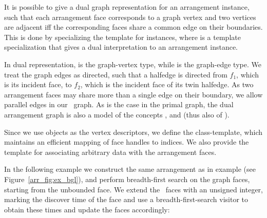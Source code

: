 It is possible to give a dual graph representation for an arrangement instance,
such that each arrangement face corresponds to a graph vertex and two vertices
are adjacent iff the corresponding faces share a common edge on their
boundaries. This is done by specializing the
 template for  instances,
where  is a template specialization that gives a
dual interpretation to an arrangement instance.

In dual representation, 
is the graph-vertex type, while  is the
graph-edge type. We treat the graph edges as directed, such that a halfedge
 is directed from $f_1$, which is its incident face, to $f_2$, which
is the incident face of its twin halfedge. As two arrangement faces may
share more than a single edge on their boundary, we allow parallel
edges in our \boost\ graph. As is the case in the primal graph, the dual
arrangement graph is also a model of the concepts ,
 and  (thus also of 
).

Since we use  objects as the vertex descriptors, we define
the  class-template, which maintains an
efficient mapping of face handles to indices. We also provide the template
 for associating arbitrary
data with the arrangement faces.

In the following example we construct the same arrangement as in
example  (see Figure~\ref{arr_fig:ex_bgl}),
and perform breadth-first search on the graph faces, starting from the
unbounded face. We extend the \dcel\ faces
with an unsigned integer, marking the discover time of the face and use a
breadth-first-search visitor to obtain these times and update the faces
accordingly:

